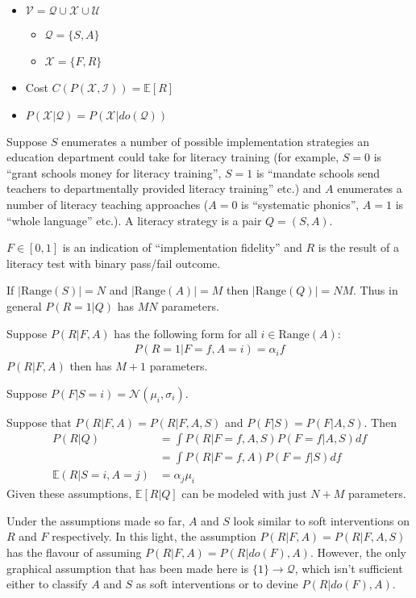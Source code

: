 \begin{itemize}
    \item $\mathcal{V}=\mathcal{Q}\cup \mathcal{X}\cup\mathcal{U}$
    \begin{itemize}
        \item $\mathcal{Q}=\{S,A\}$
        \item $\mathcal{X}=\{F,R\}$
    \end{itemize}
    \item Cost $C(P(\mathcal{X},\mathcal{I}))=\mathbb{E}[R]$
    \item $P(\mathcal{X}|\mathcal{Q})=P(\mathcal{X}|do(\mathcal{Q}))$
\end{itemize}

Suppose $S$ enumerates a number of possible implementation strategies an education department could take for literacy training (for example, $S=0$ is ``grant schools money for literacy training'', $S=1$ is ``mandate schools send teachers to departmentally provided literacy training'' etc.) and $A$ enumerates a number of literacy teaching approaches ($A=0$ is ``systematic phonics'', $A=1$ is ``whole language'' etc.). A literacy strategy is a pair $Q=(S,A)$.

$F\in [0,1]$ is an indication of ``implementation fidelity'' and $R$ is the result of a literacy test with binary pass/fail outcome.

If $|\text{Range}(S)|=N$ and $|\text{Range}(A)|=M$ then $|\text{Range}(Q)|=NM$. Thus in general $P(R=1|Q)$ has $MN$ parameters.

Suppose $P(R|F,A)$ has the following form for all $i\in \text{Range}(A)$:
\begin{align}
    P(R=1|F=f,A=i) = \alpha_i f
\end{align}
$P(R|F,A)$ then has $M+1$ parameters.

Suppose $P(F|S=i) = \mathcal{N}(\mu_i,\sigma_i)$.

Suppose that $P(R|F,A)=P(R|F,A,S)$ and $P(F|S)=P(F|A,S)$. Then
\begin{align}
    P(R|Q) &= \int P(R|F=f,A,S)P(F=f|A,S) df \\
           &= \int P(R|F=f,A)P(F=f|S) df \\
    \mathbb{E}(R|S=i,A=j) &= \alpha_j \mu_i
\end{align}
Given these assumptions, $\mathbb{E}[R|Q]$ can be modeled with just $N+M$ parameters. 

Under the assumptions made so far, $A$ and $S$ look similar to soft interventions on $R$ and $F$ respectively. In this light, the assumption $P(R|F,A)=P(R|F,A,S)$ has the flavour of assuming $P(R|F,A)=P(R|do(F),A)$. However, the only graphical assumption that has been made here is $\{1\}\to \mathcal{Q}$, which isn't sufficient either to classify $A$ and $S$ as soft interventions or to devine $P(R|do(F),A)$.

